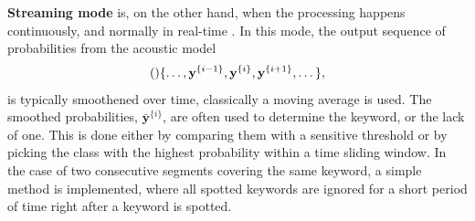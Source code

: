 \textbf{Streaming mode} is, on the other hand, when the processing happens continuously, and normally in real-time \cite{lopez2021deep}. In this mode, the output sequence of probabilities from the acoustic model
\begin{align}
    \qty\{ \dots, \textbf{y}^{\{i-1\}}, \textbf{y}^{\{i\}}, \textbf{y}^{\{i+1\}}, \dots\},
\end{align}
is typically smoothened over time, classically a moving average is used. The smoothed probabilities, \(\bar{\textbf{y}}^{\{i\}}\), are often used to determine the keyword, or the lack of one. This is done either by comparing them with a sensitive threshold or by picking the class with the highest probability within a time sliding window. In the case of two consecutive segments covering the same keyword, a simple method is implemented, where all spotted keywords are ignored for a short period of time right after a keyword is spotted.

